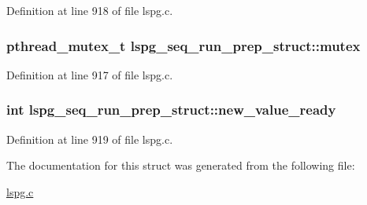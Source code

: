 Definition at line 918 of file lspg.\-c.

\hypertarget{structlspg__seq__run__prep__struct_ad146cb91b5f7dd8bb283092c28781fe7}{
\subsubsection[{mutex}]{\setlength{\rightskip}{0pt plus 5cm}pthread\-\_\-mutex\-\_\-t lspg\-\_\-seq\-\_\-run\-\_\-prep\-\_\-struct\-::mutex}}\label{structlspg__seq__run__prep__struct_ad146cb91b5f7dd8bb283092c28781fe7}


Definition at line 917 of file lspg.\-c.

\hypertarget{structlspg__seq__run__prep__struct_a42d08888327e9059ddd69ddfec31b8a9}{
\subsubsection[{new\-\_\-value\-\_\-ready}]{\setlength{\rightskip}{0pt plus 5cm}int lspg\-\_\-seq\-\_\-run\-\_\-prep\-\_\-struct\-::new\-\_\-value\-\_\-ready}}\label{structlspg__seq__run__prep__struct_a42d08888327e9059ddd69ddfec31b8a9}


Definition at line 919 of file lspg.\-c.



The documentation for this struct was generated from the following file\-:\begin{DoxyCompactItemize}
\item 
\hyperlink{lspg_8c}{lspg.\-c}\end{DoxyCompactItemize}
